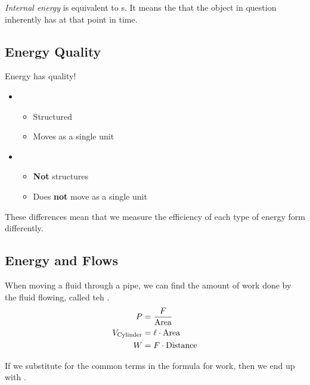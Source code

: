 \begin{definition}\label{def:Internal_Energy}
  \emph{Internal energy} is equivalent to s.
  It means the  that the object in question inherently has at that point in time.
\end{definition}

\subsection{Energy Quality}\label{subsec:Energy_Quality}
Energy has quality!
\begin{itemize}[noitemsep]
\item {}
  \begin{itemize}[noitemsep]
  \item Structured
  \item Moves as a single unit
  \end{itemize}
\item {}
  \begin{itemize}[noitemsep]
  \item \textbf{Not} structures
  \item Does \textbf{not} move as a single unit
  \end{itemize}
\end{itemize}

These differences mean that we measure the efficiency of each type of energy form differently.

\subsection{Energy and Flows}\label{subsec:Energy_and_Flows}
When moving a fluid through a pipe, we can find the amount of work done by the fluid flowing, called teh .
\begin{align*}
  P &= \frac{F}{\text{Area}} \\
  V_{\mathrm{Cylinder}} &= \ell \cdot \text{Area} \\
  W &= F \cdot \text{Distance} \\
\end{align*}

If we substitute for the common terms in the formula for work, then we end up with .

